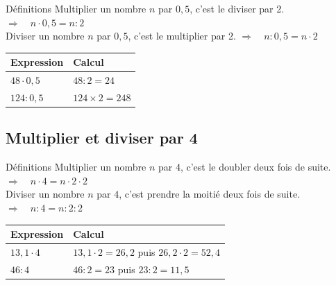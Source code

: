 \begin{regle}{Définitions}
\textcolor{themeColor}{Multiplier} un nombre $n$ par $0,5$, c'est le diviser par 2. \hspace{11pt} $\Longrightarrow\quad n\cdot 0,5 = n : 2$\\[3pt]
\textcolor{themeColor}{Diviser} un nombre $n$ par $0,5$, c'est le multiplier par 2. \hspace{10pt} $\Longrightarrow\quad n : 0,5 = n \cdot 2$
\end{regle}

\begin{tabularx}{\linewidth}{|X|X|}
\hline
\cellcolor{themeNO!30}\textbf{Expression} & \cellcolor{themeNO!30}\textbf{Calcul} \\\hline
$48 \cdot 0,5$ & $48 : 2 = 24$ \\\hline
$124 : 0,5$ & $124 \times 2 = 248$ \\\hline
\end{tabularx}

\vspace{10pt}
\subsection{Multiplier et diviser par 4}

\begin{regle}{Définitions}
\textcolor{themeColor}{Multiplier} un nombre $n$ par $4$, c'est le doubler deux fois de suite. \hspace{33pt} $\Longrightarrow\quad n\cdot 4 = n \cdot 2 \cdot 2$\\[3pt]
\textcolor{themeColor}{Diviser} un nombre $n$ par $4$, c'est prendre la moitié deux fois de suite. \hspace{10pt} $\Longrightarrow\quad n : 4 = n : 2 : 2$
\end{regle}

\begin{tabularx}{\linewidth}{|X|X|}
\hline
\cellcolor{themeNO!30}\textbf{Expression} & \cellcolor{themeNO!30}\textbf{Calcul} \\\hline
$13,1 \cdot 4$ & $13,1 \cdot 2 = 26,2$ \quad puis \quad $26,2 \cdot 2 = 52,4$ \\\hline
$46 : 4$ & $46 : 2 = 23$ \quad puis \quad $23:2=11,5$ \\\hline
\end{tabularx}
\def\arraystretch{1}
  
\newpage
\semaineinvisible
{}

